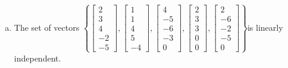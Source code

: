 \begin{exerciseAnswer}
\begin{enumerate}[(a)]
\item  The set of vectors \( \left\{ \left[\begin{array}{c}
2 \\
3 \\
4 \\
-2 \\
-5
\end{array}\right] , \left[\begin{array}{c}
1 \\
1 \\
4 \\
5 \\
-4
\end{array}\right] , \left[\begin{array}{c}
4 \\
-5 \\
-6 \\
-3 \\
0
\end{array}\right] , \left[\begin{array}{c}
2 \\
3 \\
3 \\
0 \\
0
\end{array}\right] , \left[\begin{array}{c}
2 \\
-6 \\
-2 \\
-5 \\
0
\end{array}\right] \right\} \)is linearly independent.
\end{enumerate}
    
\end{exerciseAnswer}
    
